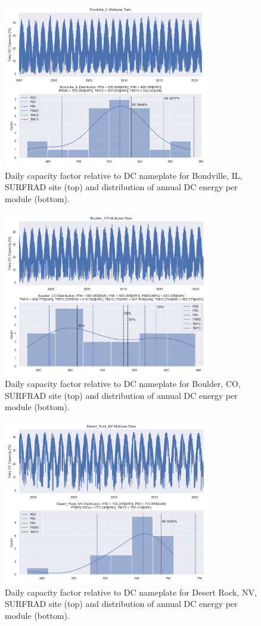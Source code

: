 \documentclass[conference]{IEEEtran}
\begin{document}
\begin{figure}[htbp]
\centerline{\includegraphics[width=9cm]{Bondville_IL.png}}
\caption{Daily capacity factor relative to DC nameplate for Bondville, IL, SURFRAD site (top) and distribution of annual DC energy per module (bottom).}
\label{fig:Bondville-IL}
\end{figure}

\begin{figure}[htbp]
\centerline{\includegraphics[width=9cm]{Boulder_CO.png}}
\caption{Daily capacity factor relative to DC nameplate for Boulder, CO, SURFRAD site (top) and distribution of annual DC energy per module (bottom).}
\label{fig:Boulder-CO}
\end{figure}

\begin{figure}[htbp]
\centerline{\includegraphics[width=9cm]{Desert_Rock_NV}}
\caption{Daily capacity factor relative to DC nameplate for Desert Rock, NV, SURFRAD site (top) and distribution of annual DC energy per module (bottom).}
\label{fig:Desert-Rock-NV}
\end{figure}
\end{document}
